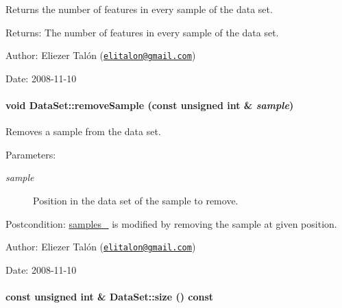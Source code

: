 Returns the number of features in every sample of the data set. 

\begin{Desc}
\item[Returns:]The number of features in every sample of the data set.\end{Desc}
\begin{Desc}
\item[Author:]Eliezer Talón (\href{mailto:elitalon@gmail.com}{\tt elitalon@gmail.com}) \end{Desc}
\begin{Desc}
\item[Date:]2008-11-10 \end{Desc}
\hypertarget{class_data_set_3bf06a1621c192660336318dd523603f}{
\paragraph[{removeSample}]{\setlength{\rightskip}{0pt plus 5cm}void DataSet::removeSample (const unsigned int \& {\em sample})}\hfill}
\label{class_data_set_3bf06a1621c192660336318dd523603f}


Removes a sample from the data set. 

\begin{Desc}
\item[Parameters:]
\begin{description}
\item[{\em sample}]Position in the data set of the sample to remove.\end{description}
\end{Desc}
\begin{Desc}
\item[Postcondition:]\hyperlink{class_data_set_cfb8c9d22aa3d295e37ef7d820c9c33e}{samples\_\-} is modified by removing the sample at given position.\end{Desc}
\begin{Desc}
\item[Author:]Eliezer Talón (\href{mailto:elitalon@gmail.com}{\tt elitalon@gmail.com}) \end{Desc}
\begin{Desc}
\item[Date:]2008-11-10 \end{Desc}
\hypertarget{class_data_set_805d7628a3ee31a4d4278deba91c0bbf}{
\paragraph[{size}]{\setlength{\rightskip}{0pt plus 5cm}const unsigned int \& DataSet::size () const}\hfill}
\label{class_data_set_805d7628a3ee31a4d4278deba91c0bbf}


